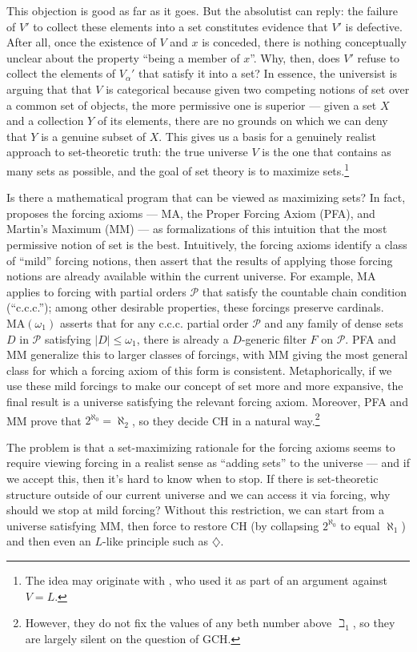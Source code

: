 \documentclass[letterpaper,12pt]{article}
\begin{document}
This objection is good as far as it goes. But the absolutist can reply: the failure of $V'$ to collect these elements into a set constitutes evidence that $V'$ is defective. After all, once the existence of $V$ and $x$ is conceded, there is nothing conceptually unclear about the property ``being a member of $x$''. Why, then, does $V'$ refuse to collect the elements of $V_\alpha'$ that satisfy it into a set? In essence, the universist is arguing that that $V$ is categorical because given two competing notions of set over a common set of objects, the more permissive one is superior --- given a set $X$ and a collection $Y$ of its elements, there are no grounds on which we can deny that $Y$ is a genuine subset of $X$. This gives us a basis for a genuinely realist approach to set-theoretic truth: the true universe $V$ is the one that contains as many sets as possible, and the goal of set theory is to maximize sets.\footnote{The idea may originate with \cite{Godel1964-GODWIC}, who used it as part of an argument against $V = L$.}

Is there a mathematical program that can be viewed as maximizing sets? In fact, \cite{magidor2012some} proposes the forcing axioms --- MA, the Proper Forcing Axiom (PFA), and Martin's Maximum (MM) --- as formalizations of this intuition that the most permissive notion of set is the best. Intuitively, the forcing axioms identify a class of ``mild'' forcing notions, then assert that the results of applying those forcing notions are already available within the current universe. For example, MA applies to forcing with partial orders $\mathcal{P}$ that satisfy the countable chain condition (``c.c.c.''); among other desirable properties, these forcings preserve cardinals. $\mathrm{MA}(\omega_1)$ asserts that for any c.c.c. partial order $\mathcal{P}$ and any family of dense sets $D$ in $\mathcal{P}$ satisfying $|D| \leq \omega_1$, there is already a $D$-generic filter $F$ on $\mathcal{P}$. PFA and MM generalize this to larger classes of forcings, with MM giving the most general class for which a forcing axiom of this form is consistent. Metaphorically, if we use these mild forcings to make our concept of set more and more expansive, the final result is a universe satisfying the relevant forcing axiom. Moreover, PFA and MM prove that $2^{\aleph_0} = \aleph_2$, so they decide CH in a natural way.\footnote{However, they do not fix the values of any beth number above $\beth_1$, so they are largely silent on the question of GCH.}

The problem is that a set-maximizing rationale for the forcing axioms seems to require viewing forcing in a realist sense as ``adding sets'' to the universe --- and if we accept this, then it's hard to know when to stop. If there is set-theoretic structure outside of our current universe and we can access it via forcing, why should we stop at mild forcing? Without this restriction, we can start from a universe satisfying MM, then force to restore CH (by collapsing $2^{\aleph_0}$ to equal $\aleph_1$) and then even an $L$-like principle such as $\diamondsuit$.
\end{document}
